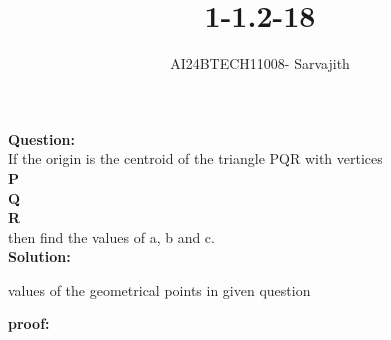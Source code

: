 \documentclass[journal]{IEEEtran}
\begin{document}

\vspace{3cm}

\title{1-1.2-18}
\author{AI24BTECH11008- Sarvajith
}
{\let\newpage\relax\maketitle}

\renewcommand{\thefigure}{\theenumi}
\renewcommand{\thetable}{\theenumi}
\setlength{\intextsep}{10pt} %
\renewcommand{\thetable}{\theenumi}
\textbf{Question: }\\
If the origin is the centroid of the triangle PQR with vertices\\
\textbf{P} \\ \textbf{Q} \\ \textbf{R}\\ then find the values of a, b and
c.\\
\textbf{Solution: }\\
\renewcommand{\tablename}{TABLE 1}
\begin{table}[h!]    
  \centering
  
  \caption{values of the geometrical points in given question}
  \label{tab1-1.2-18-1}
\end{table}
\textbf{proof: }\\ 
\end{document}
